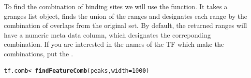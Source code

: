 \documentclass{article}\usepackage[]{graphicx}\usepackage[]{color}
\makeatletter
\newcommand{\hlnum}[1]{\textcolor[rgb]{0.686,0.059,0.569}{#1}}%
\newcommand{\hlstd}[1]{\textcolor[rgb]{0.345,0.345,0.345}{#1}}%
\newcommand{\hlkwb}[1]{\textcolor[rgb]{0.69,0.353,0.396}{#1}}%
\newcommand{\hlkwc}[1]{\textcolor[rgb]{0.333,0.667,0.333}{#1}}%
\newcommand{\hlkwd}[1]{\textcolor[rgb]{0.737,0.353,0.396}{\textbf{#1}}}%
\newenvironment{kframe}{%
 \def\at@end@of@kframe{}%
 \ifinner\ifhmode%
  \def\at@end@of@kframe{\end{minipage}}%
  \begin{minipage}{\columnwidth}%
 \fi\fi%
 \def\FrameCommand##1{\hskip\@totalleftmargin \hskip-\fboxsep
 \colorbox{shadecolor}{##1}\hskip-\fboxsep
     \hskip-\linewidth \hskip-\@totalleftmargin \hskip\columnwidth}%
 \MakeFramed {\advance\hsize-\width
   \@totalleftmargin\z@ \linewidth\hsize
   \@setminipage}}%
 {\par\unskip\endMakeFramed%
 \at@end@of@kframe}
\newenvironment{knitrout}{}{} %
\makeatother
\begin{document}
To find the combination of binding sites we will use the  function.
It takes a granges list object, finds the union of the ranges and designates each
range by the combination of overlaps from the original set.
By default, the returned ranges will have a numeric  meta data column, which designates
the correponding combination. If you are interested in the names of the TF which make 
the combinations, put the .
\begin{knitrout}
\color{fgcolor}\begin{kframe}
\begin{alltt}
\hlstd{tf.comb} \hlkwb{<-} \hlkwd{findFeatureComb}\hlstd{(peaks,} \hlkwc{width} \hlstd{=} \hlnum{1000}\hlstd{)}
\end{alltt}
\end{kframe}
\end{knitrout}
\end{document}
